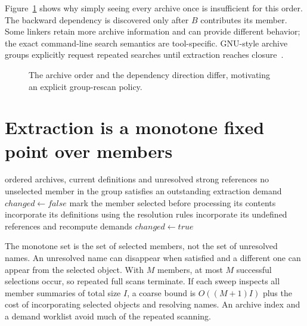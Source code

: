 Figure~\ref{fig:ch57-archive} shows why simply seeing every archive once is insufficient for this order.
The backward dependency is discovered only after $B$ contributes its member.
Some linkers retain more archive information and can provide different behavior; the exact command-line search semantics are tool-specific.
GNU-style archive groups explicitly request repeated searches until extraction reaches closure~\cite{gnu-2026-ld}.

\begin{figure}[htbp]
\centering
{}
\caption{The archive order and the dependency direction differ, motivating an explicit group-rescan policy.}
\label{fig:ch57-archive}
\end{figure}

\section{Extraction is a monotone fixed point over members}
\label{sec:ch57-closure}

\begin{algorithm}[htbp]
\caption{Search an archive group to member-extraction closure.}
\label{alg:ch57-archive}
\begin{pseudocode}
\Require ordered archives, current definitions and unresolved strong references
\Ensure no unselected member in the group satisfies an outstanding extraction demand
\Repeat
  \State $changed\gets false$
      \State mark the member selected before processing its contents
      \State incorporate its definitions using the resolution rules
      \State incorporate its undefined references and recompute demands
      \State $changed\gets true$
    \EndIf
  \EndFor
{}
\end{pseudocode}
\end{algorithm}

The monotone set is the set of selected members, not the set of unresolved names.
An unresolved name can disappear when satisfied and a different one can appear from the selected object.
With $M$ members, at most $M$ successful selections occur, so repeated full scans terminate.
If each sweep inspects all member summaries of total size $I$, a coarse bound is $O((M+1)I)$ plus the cost of incorporating selected objects and resolving names.
An archive index and a demand worklist avoid much of the repeated scanning.

